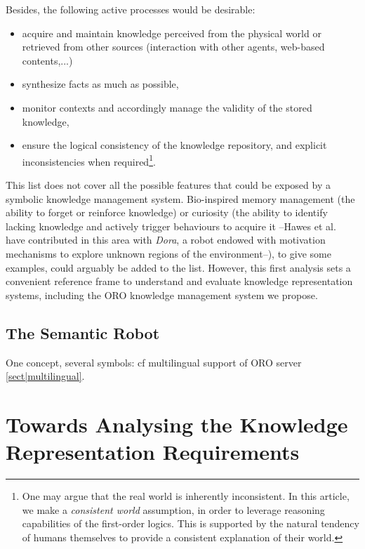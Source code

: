 Besides, the following active processes would be desirable:
\begin{itemize}
	\item acquire and maintain knowledge perceived from the physical world or
	retrieved from other sources (interaction with other agents, web-based contents,...)
	\item synthesize facts as much as possible,
	\item monitor contexts and accordingly manage the validity of the stored knowledge,
	\item ensure the logical consistency of the knowledge repository, and
	explicit inconsistencies when required\footnote{One may argue that the real world is 
	inherently inconsistent. In this article, we make a
	\textit{consistent world} assumption, in order to leverage reasoning
	capabilities of the first-order logics. This is supported by the natural
	tendency of humans themselves to provide a consistent explanation of their
	world.}.
\end{itemize}

This list does not cover all the possible features that could be exposed by a
symbolic knowledge management system. Bio-inspired memory management (the
ability to forget or reinforce knowledge) or curiosity (the ability to identify
lacking knowledge and actively trigger behaviours to acquire it --Hawes et
al.~\cite{Hawes2011} have contributed in this area with \emph{Dora}, a
robot endowed with motivation mechanisms to explore unknown regions of
the environment--), to give some examples, could arguably be added to the list.
However, this first analysis sets a convenient reference frame to understand
and evaluate knowledge representation systems, including the \textsc{ORO}
knowledge management system we propose.

\subsection{The Semantic Robot}
\label{sect|semantic}


One concept, several symbols: cf multilingual support of ORO server \ref{sect|multilingual}.


\section{Towards Analysing the Knowledge Representation Requirements}
\label{sect|krs-related-work}



